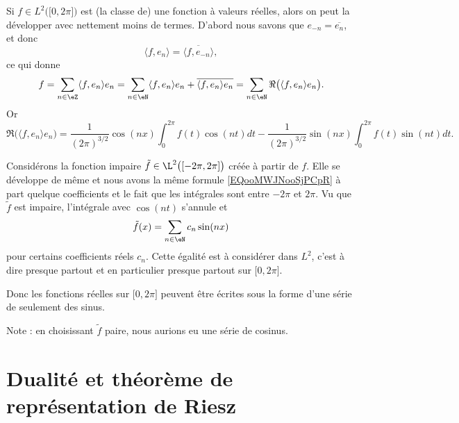 \begin{example}     \label{EXooQDWUooLtuIOm}
    Si \( f\in L^2\big( \mathopen[ 0 , 2\pi \mathclose] \big)\) est (la classe de) une fonction à valeurs réelles, alors on peut la développer avec nettement moins de termes. D'abord nous savons que \( e_{-n}=\overline{ e_n }\), et donc
    \begin{equation}
        \langle f, e_n\rangle =\overline{ \langle f, e_{-n}\rangle  },
    \end{equation}
    ce qui donne
    \begin{equation}
        f=\sum_{n\in\eZ}\langle f, e_n\rangle e_n=\sum_{n\in \eN}\langle f, e_n\rangle e_n +\overline{ \langle f, e_n\rangle e_n }=\sum_{n\in \eN}\Re\big( \langle f, e_n\rangle e_n \big).
    \end{equation}
    Or
    \begin{equation}        \label{EQooMWJNooSjPCpR}
        \Re\big( \langle f, e_n\rangle e_n \big)=\frac{1}{ (2\pi)^{3/2} }\cos(nx)\int_0^{2\pi}f(t)\cos(nt)dt-\frac{1}{ (2\pi)^{3/2} }\sin(nx)\int_0^{2\pi}f(t)\sin(nt)dt.
    \end{equation}

    Considérons la fonction impaire \( \tilde f\in\L^2\big( [-2\pi,2\pi] \big)\) créée à partir de \( f\). Elle se développe de même et nous avons la même formule \eqref{EQooMWJNooSjPCpR} à part quelque coefficients et le fait que les intégrales sont entre \( -2\pi\) et \( 2\pi\). Vu que \( \tilde f\) est impaire, l'intégrale avec \( \cos(nt)\) s'annule et
    \begin{equation}
        \tilde f(x)=\sum_{n\in \eN}c_n\sin(nx)
    \end{equation}
    pour certains coefficients réels \( c_n\). Cette égalité est à considérer dans \( L^2\), c'est à dire presque partout et en particulier presque partout sur \( \mathopen[ 0 , 2\pi \mathclose]\).

    Donc les fonctions réelles sur \( \mathopen[ 0 , 2\pi \mathclose]\) peuvent être écrites sous la forme d'une série de seulement des sinus. 

    Note : en choisissant \( \tilde f\) paire, nous aurions eu une série de cosinus.
\end{example}

\section{Dualité et théorème de représentation de Riesz}

